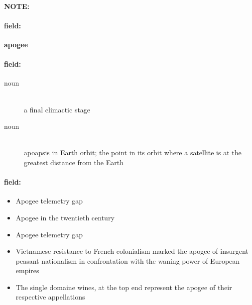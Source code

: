 \documentclass[12pt]{article}
\newenvironment{note}{\paragraph{NOTE:}}{}
\newenvironment{field}{\paragraph{field:}}{}
\begin{document}
\begin{note}
\begin{field}
\textbf{\large apogee}
\end{field}


\begin{field}
\begin{description}
\item[noun] \hfill \\ 
a final climactic stage

\item[noun] \hfill \\ 
apoapsis in Earth orbit; the point in its orbit where a satellite is at the greatest distance from the Earth

\end{description}
\end{field}

\begin{field}
\begin{itemize}
\item Apogee telemetry gap
\item Apogee in the twentieth century
\item Apogee telemetry gap
\item Vietnamese resistance to French colonialism marked the apogee of insurgent peasant nationalism in confrontation with the waning power of European empires
\item The single domaine wines, at the top end represent the apogee of their respective appellations
\end{itemize}
\end{field}
\end{note}
\end{document}
